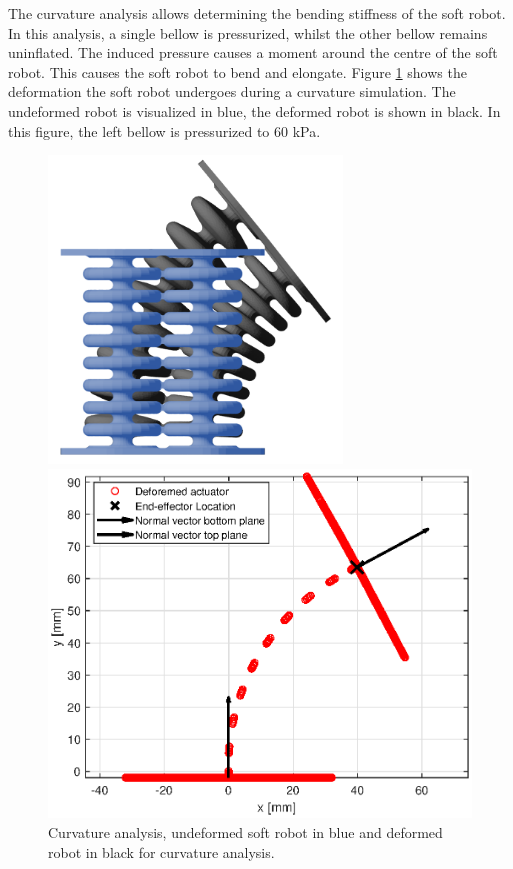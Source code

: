 The curvature analysis allows determining the bending stiffness of the soft robot. In this analysis, a single bellow is pressurized, whilst the other bellow remains uninflated. The induced pressure causes a moment around the centre of the soft robot. This causes the soft robot to bend and elongate. Figure \ref{fig3:schematiccurvature} shows the deformation the soft robot undergoes during a curvature simulation. The undeformed robot is visualized in blue, the deformed robot is shown in black. In this figure, the left bellow is pressurized to 60 kPa.



\begin{figure}[H]
    \centering
\begin{minipage}{0.5\textwidth}
        \centering
        \includegraphics[width=0.695\textwidth]{Figures/Chapter3/curvature.png} 
        \caption{Curvature analysis, undeformed soft robot in blue and deformed robot in black for curvature analysis. }
        \label{fig3:schematiccurvature}
    \end{minipage}\hfill
    \begin{minipage}{0.5\textwidth}
        \centering
        \includegraphics[width=\textwidth]{Figures/Chapter3/rotation60kpa.eps} 

\end{minipage}
\end{figure}
